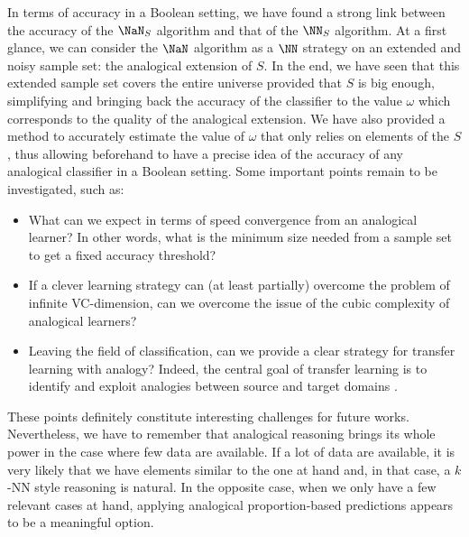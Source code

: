 \documentclass{ecai}
\begin{document}
In terms of accuracy in a Boolean setting, we have found a strong link between
the accuracy of the $\NaN_S$ algorithm and that of the $\NN_S$ algorithm. At a
first glance, we can consider the $\NaN$ algorithm as a $\NN$ strategy on an
extended and noisy sample set: the analogical extension of $S$. In the end, we
have seen that this extended sample set covers the entire universe provided
that $S$ is big enough, simplifying and bringing back the accuracy of the
classifier to the value $\omega$ which corresponds to the  quality of the
analogical extension. We have also provided a method to accurately estimate the
value of $\omega$ that only relies on elements of the $S$, thus allowing
beforehand to have a precise idea of the accuracy of any analogical classifier
in a Boolean setting. Some important points remain to be investigated, such as:
\begin{itemize}
\item What can we expect in terms of speed convergence from an analogical
  learner? In other words, what is the minimum size needed from a sample set to
  get a fixed accuracy threshold?
\item If a clever learning strategy can (at least partially) overcome the
  problem of infinite VC\mbox{-}dimension, can we overcome the issue of the
  cubic complexity of analogical learners?
\item Leaving the field of classification, can we provide a clear strategy for
  transfer learning with analogy? Indeed, the central goal of transfer
    learning is to identify and exploit analogies between source and target
    domains \cite{Pan}.
\end{itemize}
\noindent
These points definitely constitute interesting challenges for future works.
Nevertheless, we have to remember that analogical reasoning brings its whole
power in the case where few data are available. If a lot of data are available,
it is very likely that we have elements similar to the one at hand and, in that
case, a $k$-NN style reasoning is natural. In the opposite case, when we only
have a few relevant cases at hand, applying analogical proportion-based
predictions appears to be a meaningful option.

\newpage


\end{document}

